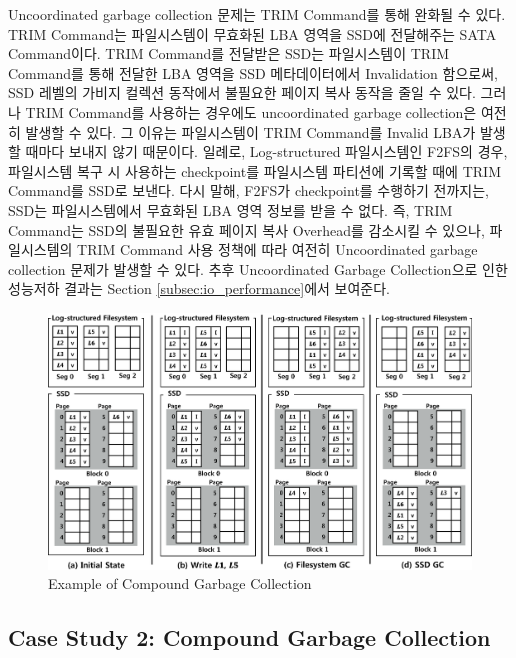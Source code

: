 \documentclass[letterpaper,twocolumn,10pt]{article}
\begin{document}
Uncoordinated garbage collection 문제는 TRIM Command\cite{shu2007data}를 통해 완화될 수 있다. TRIM Command는 파일시스템이 무효화된 LBA 영역을 SSD에 전달해주는 SATA Command이다. TRIM Command를 전달받은 SSD는 파일시스템이 TRIM Command를 통해 전달한 LBA 영역을 SSD 메타데이터에서 Invalidation 함으로써, SSD 레벨의 가비지 컬렉션 동작에서 불필요한 페이지 복사 동작을 줄일 수 있다. 그러나 TRIM Command를 사용하는 경우에도 uncoordinated garbage collection은 여전히 발생할 수 있다. 그 이유는 파일시스템이 TRIM Command를 Invalid LBA가 발생할 때마다 보내지 않기 때문이다. 일례로, Log-structured 파일시스템인 F2FS의 경우, 파일시스템 복구 시 사용하는 checkpoint를 파일시스템 파티션에 기록할 때에 TRIM Command를 SSD로 보낸다. 다시 말해, F2FS가 checkpoint를 수행하기 전까지는, SSD는 파일시스템에서 무효화된 LBA 영역 정보를 받을 수 없다. 즉, TRIM Command는 SSD의 불필요한 유효 페이지 복사 Overhead를 감소시킬 수 있으나, 파일시스템의 TRIM Command 사용 정책에 따라 여전히 Uncoordinated garbage collection 문제가 발생할 수 있다. 추후 Uncoordinated Garbage Collection으로 인한 성능저하 결과는 Section \ref{subsec:io_performance}에서 보여준다.


\begin{figure}[t]
\begin{center}
\includegraphics[width=6in]{./figure/comp_gc_scenario_1}
\caption{Example of Compound Garbage Collection}
\label{fig:comp_gc_1}
\end{center}
\end{figure}

\subsection{Case Study 2: Compound Garbage Collection}
\label{subsec:case_study_1}
\end{document}
